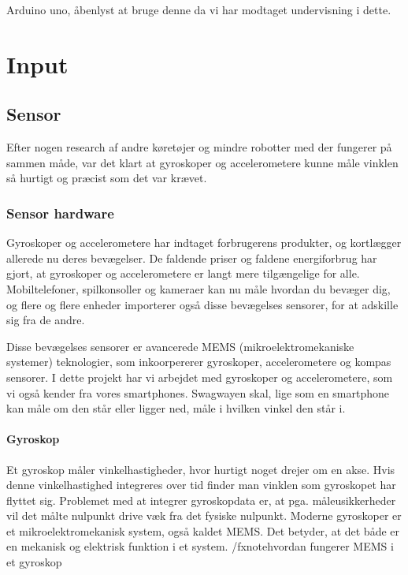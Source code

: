 \documentclass[a4paper,oneside,article,danish,table]{memoir}
\begin{document}
Arduino uno, åbenlyst at bruge denne da vi har modtaget undervisning i dette.

\chapter{Input}
\section{Sensor}
Efter nogen research af andre køretøjer og mindre robotter med der fungerer på sammen måde, var det klart at gyroskoper og accelerometere kunne måle vinklen så hurtigt og præcist som det var krævet.
\subsection{Sensor hardware}
Gyroskoper og accelerometere har indtaget forbrugerens produkter, og kortlægger allerede nu deres bevægelser. De faldende priser og faldene energiforbrug har gjort, at gyroskoper og accelerometere er langt mere tilgængelige for alle. Mobiltelefoner, spilkonsoller og kameraer kan nu måle hvordan du bevæger dig, og flere og flere enheder importerer også disse bevægelses sensorer, for at adskille sig fra de andre.

Disse bevægelses sensorer er avancerede MEMS (mikroelektromekaniske systemer) teknologier, som inkoorpererer gyroskoper, accelerometere og kompas sensorer. %
I dette projekt har vi arbejdet med gyroskoper og accelerometere, som vi også kender fra vores smartphones. Swagwayen skal, lige som en smartphone kan måle om den står eller ligger ned, måle i hvilken vinkel den står i.   

\subsubsection{Gyroskop}
Et gyroskop måler vinkelhastigheder, hvor hurtigt noget drejer om en akse. Hvis denne vinkelhastighed integreres over tid finder man vinklen som gyroskopet har flyttet sig. Problemet med at integrer gyroskopdata er, at pga. måleusikkerheder vil det målte nulpunkt drive væk fra det fysiske nulpunkt. Moderne gyroskoper er et mikroelektromekanisk system, også kaldet MEMS. Det betyder, at det både er en mekanisk og elektrisk funktion i et system. /fxnote{hvordan fungerer MEMS i et gyroskop}
\end{document}
